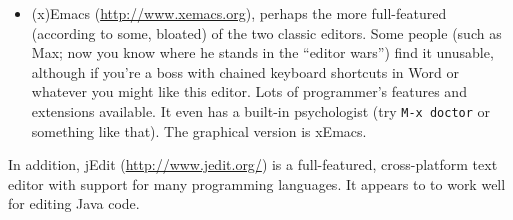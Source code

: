 \documentclass[12pt]{article}
\begin{document}
\begin{description}
\begin{itemize}
            \item (x)Emacs (\url{http://www.xemacs.org}), perhaps the more full-featured (according to some, bloated) of the two classic editors. Some people (such as Max; now you know where he stands in the ``editor wars'') find it unusable, although if you're a boss with chained keyboard shortcuts in Word or whatever you might like this editor. Lots of programmer's features and extensions available. It even has a built-in psychologist (try \texttt{M-x doctor} or something like that). The graphical version is xEmacs.
        \end{itemize}
        In addition, jEdit (\url{http://www.jedit.org/}) is a full-featured, cross-platform text editor with support for many programming languages. It appears to to work well for editing Java code.
\end{description}
\end{document}
